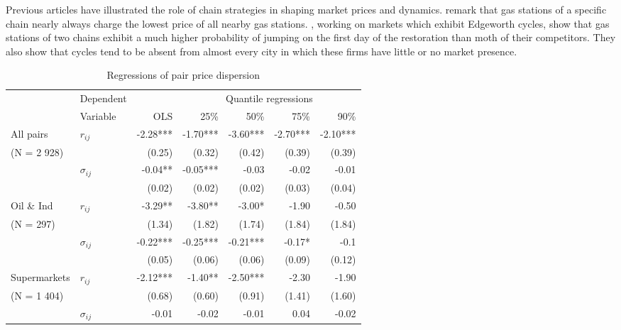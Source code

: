 \documentclass[english]{article}
\begin{document}
Previous articles have illustrated the role of chain strategies in shaping market prices and dynamics. \cite{HOS08} remark that gas stations of a specific chain nearly always charge the lowest price of all nearby gas stations. \cite{LEW12}, working on markets which exhibit Edgeworth cycles, show that gas stations of two chains exhibit a much higher probability of jumping on the first day of the restoration than moth of their competitors. They also show that cycles tend to be absent from almost every city in which these firms have little or no market presence.

\begin{table}[hbtp]
\begin{threeparttable}
\renewcommand{\arraystretch}{0.8} %
\caption{Regressions of pair price dispersion}
\label{tab:regs_pairs}
\begin{tabular}{llrrrrr} %
\toprule
\toprule
          & \multicolumn{1}{l}{Dependent} &       & \multicolumn{4}{c}{Quantile regressions} \\
          & \multicolumn{1}{l}{Variable} & OLS   & 25\%  & 50\%  & 75\%  & 90\% \\
\midrule
    \multicolumn{1}{l}{All pairs} & \multicolumn{1}{l}{$r_{ij}$} & -2.28*** & -1.70*** & -3.60*** & -2.70*** & -2.10*** \\
    \multicolumn{1}{l}{(N =  2 928)} &       & (0.25) & (0.32) & (0.42) & (0.39) & (0.39) \\
          & \multicolumn{1}{l}{$\sigma_{ij}$} & -0.04** & -0.05*** & -0.03 & -0.02 & -0.01 \\
          &       & (0.02) & (0.02) & (0.02) & (0.03) & (0.04) \\
\midrule
    \multicolumn{1}{l}{Oil \& Ind} & \multicolumn{1}{l}{$r_{ij}$} & -3.29** & -3.80** & -3.00* & -1.90 & -0.50 \\
    \multicolumn{1}{l}{ (N = 297)} &       & (1.34) & (1.82) & (1.74) & (1.84) & (1.84) \\
          & \multicolumn{1}{l}{$\sigma_{ij}$} & -0.22*** & -0.25*** & -0.21*** & -0.17* & -0.1 \\
          &       & (0.05) & (0.06) & (0.06) & (0.09) & (0.12) \\
\midrule
    \multicolumn{1}{l}{Supermarkets} & \multicolumn{1}{l}{$r_{ij}$} & -2.12*** & -1.40** & -2.50*** & -2.30 & -1.90 \\
    \multicolumn{1}{l}{ (N = 1 404)} &       & (0.68) & (0.60) & (0.91) & (1.41) & (1.60) \\
          & \multicolumn{1}{l}{$\sigma_{ij}$} & -0.01 & -0.02 & -0.01 & 0.04  & -0.02 \\

\end{tabular}
\end{threeparttable}
\end{table}
\end{document}
